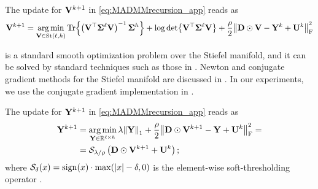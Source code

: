 
The update for $\mathbf{V}^{k+1}$ in \eqref{eq:MADMMrecursion_app} reads as
\begin{equation}\label{eq:updateV}
    \V^{k+1} = \argmin_{\V \in \stiefel{\ell}{h}} \Tr{\left( \V^\top \covlow \V\right)^{-1} \covhigh} + \log\det{\V^\top \covlow \V} + \frac{\rho}{2}\frob{\D\odot \V  - \Y^k + \scaledU^k}^2     
\end{equation}

 is a standard smooth optimization problem over the Stiefel manifold, and it can be solved by standard techniques such as those in .
Newton and conjugate gradient methods for the Stiefel manifold are discussed in .
In our experiments, we use the conjugate gradient implementation in .

The update for $\mathbf{Y}^{k+1}$ in \eqref{eq:MADMMrecursion_app} reads as
\begin{equation}\label{eq:updateY_madmm}
    \begin{aligned}
        \mathbf{Y}^{k+1} &= \operatorname*{arg\,min}_{\mathbf{Y} \in \mathbb{R}^{\ell \times h}} \lambda\norm{\mathbf{Y}}_1 + \frac{\rho}{2}\norm{\mathbf{D} \odot \mathbf{V}^{k+1} - \mathbf{Y} + \mathbf{U}^k}_{\mathrm{F}}^2 = \\
        &= \mathcal{S}_{\lambda/\rho} \left( \mathbf{D} \odot \mathbf{V}^{k+1} + \mathbf{U}^k \right);
    \end{aligned}
\end{equation}
where $\mathcal{S}_{\delta}(x)=\mathrm{sign}(x) \cdot \max(\abs{x}-\delta, 0)$ is the element-wise soft-thresholding operator .

